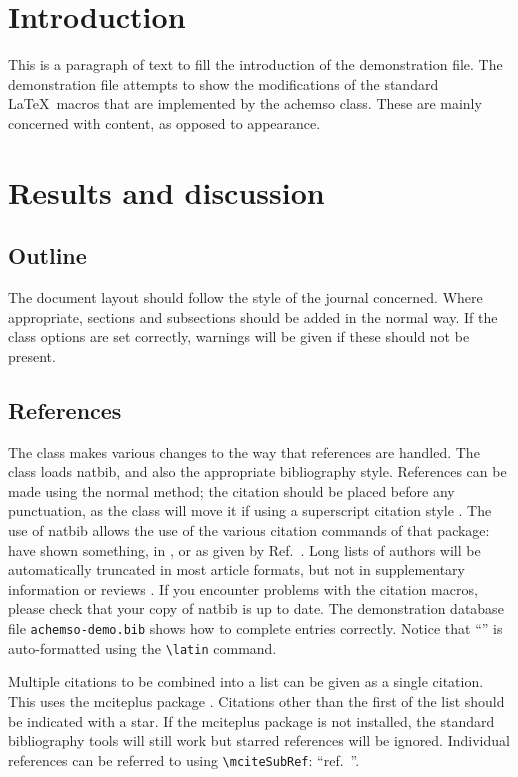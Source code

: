 \documentclass[journal=jacsat,manuscript=article]{achemso}
\begin{document}
\section{Introduction}
This is a paragraph of text to fill the introduction of the
demonstration file.  The demonstration file attempts to show the
modifications of the standard \LaTeX\ macros that are implemented by
the \textsf{achemso} class.  These are mainly concerned with content,
as opposed to appearance.

\section{Results and discussion}

\subsection{Outline}

The document layout should follow the style of the journal concerned.
Where appropriate, sections and subsections should be added in the
normal way. If the class options are set correctly, warnings will be
given if these should not be present.

\subsection{References}

The class makes various changes to the way that references are
handled.  The class loads \textsf{natbib}, and also the
appropriate bibliography style.  References can be made using
the normal method; the citation should be placed before any
punctuation, as the class will move it if using a superscript
citation style
\cite{Mena2000,Abernethy2003,Friedman-Hill2003,EuropeanCommission2008}.
The use of \textsf{natbib} allows the use of the various citation
commands of that package: \citeauthor{Abernethy2003} have shown
something, in \citeyear{Cotton1999}, or as given by
Ref.~.  Long lists of authors will be
automatically truncated in most article formats, but not in
supplementary information or reviews \cite{Pople2003}. If you
encounter problems with the citation macros, please check that
your copy of \textsf{natbib} is up to date. The demonstration
database file \texttt{achemso-demo.bib} shows how to complete
entries correctly. Notice that ``'' is auto-formatted
using the \texttt{\textbackslash latin} command.

Multiple citations to be combined into a list can be given as
a single citation.  This uses the \textsf{mciteplus} package
\cite{Johnson1972,*Arduengo1992,*Eisenstein2005,*Arduengo1994}.
Citations other than the first of the list should be indicated
with a star. If the \textsf{mciteplus} package is not installed,
the standard bibliography tools will still work but starred
references will be ignored. Individual references can be referred
to using \texttt{\textbackslash mciteSubRef}:
``ref.~''.
\end{document}
